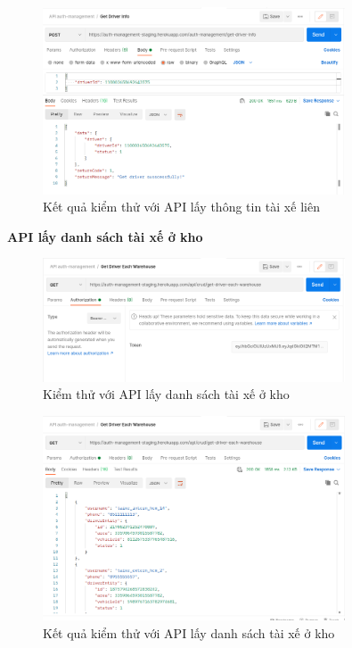 		\begin{figure}[!ht]
			\includegraphics[width=0.8\textwidth]{Images/testing/API-get-driver-info-result.png}
			\centering
			\linebreak
			\caption{Kết quả kiểm thử với API lấy thông tin tài xế liên}
		\end{figure}
		
		\newpage
		
		\textbf{API lấy danh sách tài xế ở kho}
		
		\begin{figure}[!ht]
			\includegraphics[width=0.8\textwidth]{Images/testing/API-get-driver-warehouse.png}
			\centering
			\linebreak
			\caption{Kiểm thử với API lấy danh sách tài xế ở kho}
		\end{figure}
		
		\begin{figure}[!ht]
			\includegraphics[width=0.8\textwidth]{Images/testing/API-get-driver-warehouse-result.png}
			\centering
			\linebreak
			\caption{Kết quả kiểm thử với API lấy danh sách tài xế ở kho}
		\end{figure}
		
